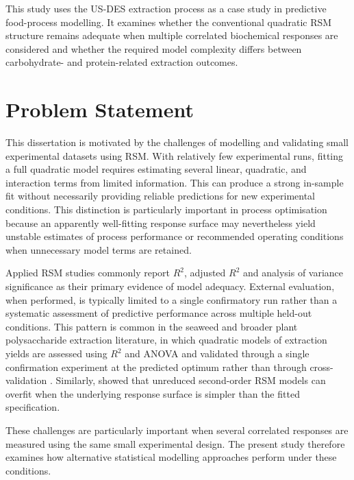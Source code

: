 \documentclass[MScDSA]{uccthesis}
\begin{document}
This study uses the US-DES extraction process as a case study in predictive food-process modelling. It examines whether the conventional quadratic RSM structure remains adequate when multiple correlated biochemical responses are considered and whether the required model complexity differs between carbohydrate- and protein-related extraction outcomes. 

\section{Problem Statement}
\label{sec:problem_statement}
This dissertation is motivated by the challenges of modelling and validating small experimental datasets using RSM. With relatively few experimental runs, fitting a full quadratic model requires estimating several linear, quadratic, and interaction terms from limited information. This can produce a strong in-sample fit without necessarily providing reliable predictions for new experimental conditions. This distinction is particularly important in process optimisation because an apparently well-fitting response surface may nevertheless yield unstable estimates of process performance or recommended operating conditions when unnecessary model terms are retained.

Applied RSM studies commonly report $R^2$, adjusted $R^2$ and analysis of variance significance as their primary evidence of model adequacy. External evaluation, when performed, is typically limited to a single confirmatory run rather than a systematic assessment of predictive performance across multiple held-out conditions. This pattern is common in the seaweed and broader plant polysaccharide extraction literature, in which  quadratic models of extraction yields are assessed using $R^2$ and ANOVA and validated through a single confirmation experiment at the predicted optimum rather than through cross-validation \parencite{Wan:2015, Zhan:2022}. Similarly, \parencite{Smucker:2021} showed that unreduced second-order RSM models can overfit when the underlying response surface is simpler than the fitted specification.

These challenges are particularly important when several correlated responses are measured using the same small experimental design. The present study therefore examines how alternative statistical modelling approaches perform under these conditions.
\end{document}
